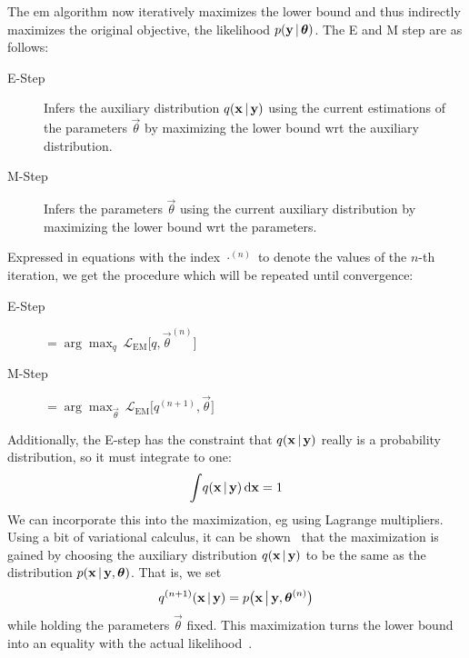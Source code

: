 	The \ac{em} algorithm now iteratively maximizes the lower bound and thus indirectly maximizes the original objective, the likelihood \( p(\boldsymbol{\mathrm{y}} \,\vert\, \boldsymbol{\mathrm{\theta}}) \). The E and M step are as follows:
	\begin{description}
		\item[E-Step] Infers the auxiliary distribution \( q(\boldsymbol{\mathrm{x}} \,\vert\, \boldsymbol{\mathrm{y}}) \) using the current estimations of the parameters \( \vec{\theta} \) by maximizing the lower bound \ac{wrt} the auxiliary distribution.
		\item[M-Step] Infers the parameters \(\vec{\theta}\) using the current auxiliary distribution by maximizing the lower bound \ac{wrt} the parameters.
	\end{description}
	Expressed in equations with the index \( \cdot^{(n)} \) to denote the values of the \(n\)-th iteration, we get the procedure which will be repeated until convergence:
	\begin{description}
		\item[E-Step]  \(\displaystyle = \arg\max_{q}\, \mathcal{L}_\mathrm{EM}\big[ q, \vec{\theta}^{(n)} \big] \)
		\item[M-Step]  \(\displaystyle = \arg\max_{\vec{\theta}}\, \mathcal{L}_\mathrm{EM}\big[ q^{(n + 1)}, \vec{\theta} \big] \)
	\end{description}
	Additionally, the E-step has the constraint that \(q(\boldsymbol{\mathrm{x}} \,\vert\, \boldsymbol{\mathrm{y}})\) really is a probability distribution, so it must integrate to one:
	\begin{align*}
		\int\! q(\boldsymbol{\mathrm{x}} \,\vert\, \boldsymbol{\mathrm{y}}) \dd{\boldsymbol{\mathrm{x}}} = 1
	\end{align*}
	We can incorporate this into the maximization, \ac{eg} using Lagrange multipliers. Using a bit of variational calculus, it can be shown~\cite{bealVariationalAlgorithmsApproximate2003} that the maximization is gained by choosing the auxiliary distribution \(q(\boldsymbol{\mathrm{x}} \,\vert\, \boldsymbol{\mathrm{y}})\) to be the same as the distribution \( p(\boldsymbol{\mathrm{x}} \,\vert\, \boldsymbol{\mathrm{y}}, \boldsymbol{\mathrm{\theta}}) \). That is, we set
	\begin{align*}
		q^{(n + 1)}(\boldsymbol{\mathrm{x}} \,\vert\, \boldsymbol{\mathrm{y}}) = p\big(\boldsymbol{\mathrm{x}} \,\big\vert\, \boldsymbol{\mathrm{y}}, \boldsymbol{\mathrm{\theta}}^{(n)}\big)
	\end{align*}
	while holding the parameters \(\vec{\theta}\) fixed. This maximization turns the lower bound into an equality with the actual likelihood~\cite{bealVariationalAlgorithmsApproximate2003}.

